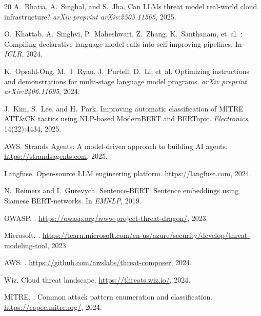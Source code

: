 \documentclass{article}
\begin{document}
\begin{thebibliography}{20}
A.~Bhatia, A.~Singhal, and S.~Jha.
\newblock Can {LLMs} threat model real-world cloud infrastructure?
\newblock \emph{arXiv preprint arXiv:2505.11565}, 2025.

O.~Khattab, A.~Singhvi, P.~Maheshwari, Z.~Zhang, K.~Santhanam, et~al.
: Compiling declarative language model calls into self-improving pipelines.
\newblock In \emph{ICLR}, 2024.

K.~Opsahl-Ong, M.~J. Ryan, J.~Purtell, D.~Li, et~al.
\newblock Optimizing instructions and demonstrations for multi-stage language model programs.
\newblock \emph{arXiv preprint arXiv:2406.11695}, 2024.

J.~Kim, S.~Lee, and H.~Park.
\newblock Improving automatic classification of {MITRE ATT\&CK} tactics using {NLP}-based {ModernBERT} and {BERTopic}.
\newblock \emph{Electronics}, 14(22):4434, 2025.

AWS.
\newblock Strands Agents: A model-driven approach to building {AI} agents.
\newblock \url{https://strandsagents.com}, 2025.

Langfuse.
\newblock Open-source {LLM} engineering platform.
\newblock \url{https://langfuse.com}, 2024.

N.~Reimers and I.~Gurevych.
\newblock Sentence-{BERT}: Sentence embeddings using {Siamese BERT}-networks.
\newblock In \emph{EMNLP}, 2019.

OWASP.
.
\newblock \url{https://owasp.org/www-project-threat-dragon/}, 2023.

Microsoft.
.
\newblock \url{https://learn.microsoft.com/en-us/azure/security/develop/threat-modeling-tool}, 2023.

AWS.
.
\newblock \url{https://github.com/awslabs/threat-composer}, 2024.

Wiz.
\newblock Cloud threat landscape.
\newblock \url{https://threats.wiz.io/}, 2024.

MITRE.
: Common attack pattern enumeration and classification.
\newblock \url{https://capec.mitre.org/}, 2024.

\end{thebibliography}

\appendix

\end{document}
